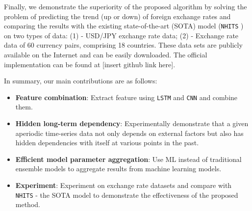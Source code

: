 \documentclass[aps,prb,groupedaddress,twocolumn,showpacs,dvipdfmx,superscriptaddress,pdftex]{revtex4-2}
\begin{document}
\vspace{2mm}


Finally, we demonstrate the superiority of the proposed algorithm by solving the problem of predicting the trend (up or down) of foreign exchange rates and comparing the results with the existing state-of-the-art (SOTA) model (\verb|NHITS| \cite{challu2023nhits}) on two types of data: (1) - USD/JPY exchange rate data; (2) - Exchange rate data of 60 currency pairs, comprising 18 countries. These data sets are publicly available on the Internet and can be easily downloaded. The official implementation can be found at [insert github link here].

\vspace{2mm}

In summary, our main contributions are as follows:

\begin{itemize}
    \item \textbf{Feature combination}: Extract feature using \verb|LSTM| and \verb|CNN| and combine them.

    \item \textbf{Hidden long-term dependency}: Experimentally demonstrate that a given aperiodic time-series data not only depends on external factors but also has hidden dependencies with itself at various points in the past.

    \item \textbf{Efficient model parameter aggregation}: Use ML instead of traditional ensemble models to aggregate results from machine learning models.

    \item \textbf{Experiment}: Experiment on exchange rate datasets and compare with \verb|NHITS| - the SOTA model to demonstrate the effectiveness of the proposed method.
\end{itemize}
\end{document}
